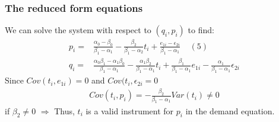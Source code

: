 \documentclass[a4paper,twoside,11pt]{article}
\begin{document}
\subsubsection{The reduced form equations}
We can solve the system with respect to $(q_i,p_i)$ to find:
\begin{equation*}
\begin{aligned}
p_i =& \frac{\alpha_0 - \beta_0}{\beta_1 - \alpha_1} - \frac{\beta_2}{\beta_1 - \alpha_2} t_i + \frac{e_{1i}- \epsilon_{2i}}{\beta_1 - \alpha_1} \ \ \ \ \ (5)\\
q_i =& \frac{\alpha_0 \beta_1 - \alpha_1 \beta_0 }{\beta_1 - \alpha_1} - \frac{\alpha_1 \beta_2}{\beta_1 - \alpha_1}t_i + \frac{\beta_1}{\beta_1 -  \alpha_1}e_{1i} - \frac{\alpha_1}{\beta_1 - \alpha_1} \epsilon_{2i} 
\end{aligned} 
\end{equation*}
Since $Cov(t_i, e_{1i})=0$ and $Cov(t_i, \epsilon_{2i} =0$
\begin{equation*}
\begin{aligned}
Cov(t_i, p_i) = - \frac{\beta_2}{\beta_1 - \alpha_1} Var(t_i) \ne 0
\end{aligned} 
\end{equation*}
if $\beta_2 \ne 0$
\newline
\newline
$\Rightarrow$ Thus, $t_i$ is a valid instrument for $p_i$ in the demand equation. 
\end{document}
